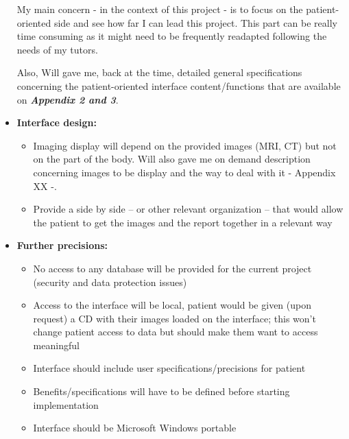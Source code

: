 \begin{itemize}
My main concern - in the context of this project - is to focus on the patient-oriented side and see how far I can lead this project. This part can be really time consuming as it might need to be frequently readapted following the needs of my tutors.

Also, Will gave me, back at the time, detailed general specifications concerning the patient-oriented interface content/functions that are available on \textbf{\textit{Appendix 2 and 3}}.


\item \textbf{Interface design:}
\begin{itemize}
\item Imaging display will depend on the provided images (MRI, CT) but not on the part of the body. Will also gave me on demand description concerning images to be display and the way to deal with it - Appendix XX -.
\item Provide a side by side – or other relevant organization – that would allow the patient to get the images and the report together in a relevant way
\end{itemize}


\item \textbf{Further precisions:}
\begin{itemize}
\item No access to any database will be provided for the current project (security and data protection issues) 
\item Access to the interface will be local, patient would be given (upon request) a CD with their images loaded on the interface; this won’t change patient access to data but should make them want to access meaningful
\item Interface should include user specifications/precisions for patient 
\item Benefits/specifications will have to be defined before starting implementation
\item Interface should be Microsoft Windows portable
\end{itemize}


\end{itemize}






